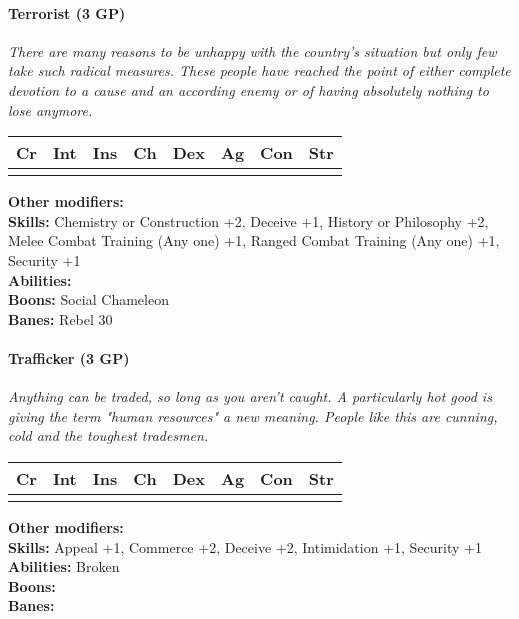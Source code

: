 \paragraph*{Terrorist (3 GP)}
\textit{There are many reasons to be unhappy with the country's situation but only few take such radical measures. These people have reached the point of either complete devotion to a cause and an according enemy or of having absolutely nothing to lose anymore.}\par
\begin{tabular}{|l|l|l|l|l|l|l|l|}
	\hline
	Cr & Int & Ins & Ch & Dex & Ag & Con & Str \\ \hline
	&  &  &  &  &  &  &  \\ \hline
\end{tabular}\par
\noindent\textbf{Other modifiers:} \\
\textbf{Skills:} Chemistry or Construction +2,
Deceive +1,
History or Philosophy +2,
Melee Combat Training (Any one) +1,
Ranged Combat Training (Any one) +1,
Security +1\\
\textbf{Abilities:} \\
\textbf{Boons:} Social Chameleon\\
\textbf{Banes:} Rebel 30\\

\hrulefill
\paragraph*{Trafficker (3 GP)}
\textit{Anything can be traded, so long as you aren't caught. A particularly hot good is giving the term "human resources" a new meaning. People like this are cunning, cold and the toughest tradesmen.}\par
\begin{tabular}{|l|l|l|l|l|l|l|l|}
	\hline
	Cr & Int & Ins & Ch & Dex & Ag & Con & Str \\ \hline
	&  &  &  &  &  &  &  \\ \hline
\end{tabular}\par
\noindent\textbf{Other modifiers:} \\
\textbf{Skills:} Appeal +1,
Commerce +2,
Deceive +2,
Intimidation +1,
Security +1\\
\textbf{Abilities:} Broken\\
\textbf{Boons:} \\
\textbf{Banes:}

\hrulefill
